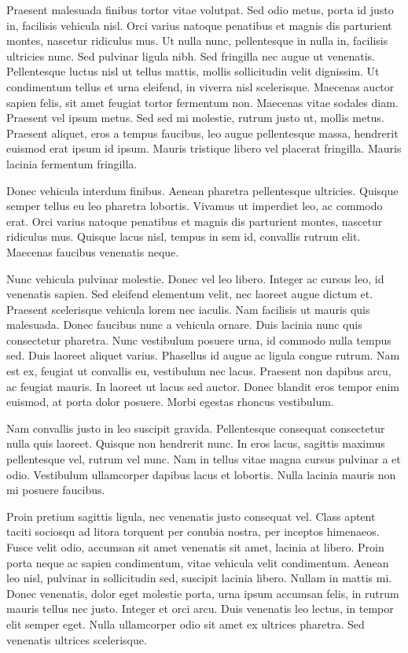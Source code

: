 \documentclass[a4paper,10pt,twoside]{article} %
\begin{document}
Praesent malesuada finibus tortor vitae volutpat.
Sed odio metus, porta id justo in, facilisis vehicula nisl.
Orci varius natoque penatibus et magnis dis parturient montes, nascetur ridiculus mus.
Ut nulla nunc, pellentesque in nulla in, facilisis ultricies nunc.
Sed pulvinar ligula nibh.
Sed fringilla nec augue ut venenatis.
Pellentesque luctus nisl ut tellus mattis, mollis sollicitudin velit dignissim.
Ut condimentum tellus et urna eleifend, in viverra nisl scelerisque.
Maecenas auctor sapien felis, sit amet feugiat tortor fermentum non.
Maecenas vitae sodales diam.
Praesent vel ipsum metus.
Sed sed mi molestie, rutrum justo ut, mollis metus.
Praesent aliquet, eros a tempus faucibus, leo augue pellentesque massa, hendrerit euismod erat ipsum id ipsum.
Mauris tristique libero vel placerat fringilla.
Mauris lacinia fermentum fringilla.

Donec vehicula interdum finibus.
Aenean pharetra pellentesque ultricies.
Quisque semper tellus eu leo pharetra lobortis.
Vivamus ut imperdiet leo, ac commodo erat.
Orci varius natoque penatibus et magnis dis parturient montes, nascetur ridiculus mus.
Quisque lacus nisl, tempus in sem id, convallis rutrum elit.
Maecenas faucibus venenatis neque.

Nunc vehicula pulvinar molestie.
Donec vel leo libero.
Integer ac cursus leo, id venenatis sapien.
Sed eleifend elementum velit, nec laoreet augue dictum et.
Praesent scelerisque vehicula lorem nec iaculis.
Nam facilisis ut mauris quis malesuada.
Donec faucibus nunc a vehicula ornare.
Duis lacinia nunc quis consectetur pharetra.
Nunc vestibulum posuere urna, id commodo nulla tempus sed.
Duis laoreet aliquet varius.
Phasellus id augue ac ligula congue rutrum.
Nam est ex, feugiat ut convallis eu, vestibulum nec lacus.
Praesent non dapibus arcu, ac feugiat mauris.
In laoreet ut lacus sed auctor.
Donec blandit eros tempor enim euismod, at porta dolor posuere.
Morbi egestas rhoncus vestibulum.

Nam convallis justo in leo suscipit gravida.
Pellentesque consequat consectetur nulla quis laoreet.
Quisque non hendrerit nunc.
In eros lacus, sagittis maximus pellentesque vel, rutrum vel nunc.
Nam in tellus vitae magna cursus pulvinar a et odio.
Vestibulum ullamcorper dapibus lacus et lobortis.
Nulla lacinia mauris non mi posuere faucibus.

Proin pretium sagittis ligula, nec venenatis justo consequat vel.
Class aptent taciti sociosqu ad litora torquent per conubia nostra, per inceptos himenaeos.
Fusce velit odio, accumsan sit amet venenatis sit amet, lacinia at libero.
Proin porta neque ac sapien condimentum, vitae vehicula velit condimentum.
Aenean leo nisl, pulvinar in sollicitudin sed, suscipit lacinia libero.
Nullam in mattis mi.
Donec venenatis, dolor eget molestie porta, urna ipsum accumsan felis, in rutrum mauris tellus nec justo.
Integer et orci arcu.
Duis venenatis leo lectus, in tempor elit semper eget.
Nulla ullamcorper odio sit amet ex ultrices pharetra.
Sed venenatis ultrices scelerisque.
\end{document}
